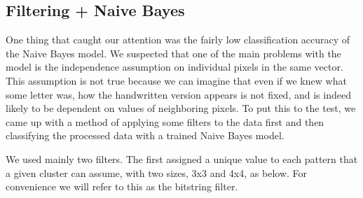 \documentclass{article} %
\begin{document}
%
%
%

\subsection{Filtering +  Naive Bayes}

One thing that caught our attention was the fairly low classification accuracy of the Naive Bayes model. We suspected that one of the main problems with the model is the independence assumption on individual pixels in the same vector. This assumption is not true because we can imagine that even if we knew what some letter was, how the handwritten version appears is not fixed, and is indeed likely to be dependent on values of neighboring pixels. To put this to the test, we came up with a method of applying some filters to the data first and then classifying the processed data with a trained Naive Bayes model.

We used mainly two filters. The first assigned a unique value to each pattern that a given cluster can assume, with two sizes, 3x3 and 4x4, as below. For convenience we will refer to this as the bitstring filter.
\end{document}
